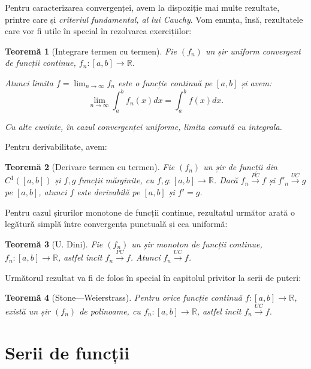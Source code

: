 \documentclass[11pt,a4paper]{article}
\newcommand\ds{\displaystyle}
\newcommand\xrar{\xrightarrow}
\newcommand\RR{\mathbb{R}}
\theoremstyle{dotless}
\newtheorem{theorem}{Teorem\u{a}}[section]
\theoremstyle{dotlessdr}
\begin{document}
\vspace{1cm}

Pentru caracterizarea convergenței, avem la dispoziție mai multe rezultate,
printre care și \emph{criteriul fundamental, al lui Cauchy}. Vom enunța, însă,
rezultatele care vor fi utile în special în rezolvarea exercițiilor:

\begin{theorem}[Integrare termen cu termen]\label{thm:uc-integrala}
  Fie $(f_n)$ un șir uniform convergent de funcții continue, $f_n : [a, b] \to \RR$.

  Atunci limita $f = \ds\lim_{n \to \infty} f_n$ este o funcție continuă pe
  $[a, b]$ și avem:
  \[
    \lim_{n \to \infty} \int_a^b f_n(x) dx = \int_a^b f(x) dx.
  \]

  Cu alte cuvinte, în cazul convergenței uniforme, limita comută cu integrala.
\end{theorem}

Pentru derivabilitate, avem:

\begin{theorem}[Derivare termen cu termen]\label{thm:uc-derivata}
  Fie $(f_n)$ un șir de funcții din $C^1([a, b])$ și $f, g$ funcții mărginite,
  cu $f, g : [a, b] \to \RR$. Dacă $f_n \xrar{PC} f$ și $f'_n \xrar{UC} g$ pe
  $[a, b]$, atunci $f$ este derivabilă pe $[a, b]$ și $f' = g$.
\end{theorem}

Pentru cazul șirurilor monotone de funcții continue, rezultatul următor arată
o legătură simplă între convergența punctuală și cea uniformă:

\begin{theorem}[U. Dini]\label{thm:dini}
  Fie $(f_n)$ un șir monoton de funcții continue, $f_n : [a, b] \to \RR$, astfel
  încît $f_n \xrar{PC} f$. Atunci $f_n \xrar{UC} f$.
\end{theorem}

Următorul rezultat va fi de folos în special în capitolul privitor la serii
de puteri:
\begin{theorem}[Stone---Weierstrass]\label{thm:label}
  Pentru orice funcție continuă $f : [a, b] \to \RR$, există un șir $(f_n)$
  \emph{de polinoame}, cu $f_n : [a, b] \to \RR$, astfel încît $f_n \xrar{UC} f$.
\end{theorem}


\section{Serii de funcții}
\label{sec:serii-f}
\end{document}

